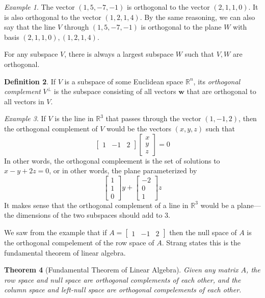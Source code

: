 \documentclass[11pt,oneside]{amsbook}
\newcommand{\R}{\mathbb R}
\theoremstyle{definition}
\theoremstyle{plain}
\newtheorem{theorem}{Theorem}[section]
\theoremstyle{definition}
\newtheorem{definition}[theorem]{Definition}
\theoremstyle{remark}
\newtheorem{example}[theorem]{Example}
\numberwithin{equation}{section}
\numberwithin{figure}{section}
\begin{document}
\begin{example}
  The vector $(1,5,-7,-1)$ is orthogonal to the vector $(2,1,1,0)$. It is also orthogonal to the vector $(1,2,1,4)$. By the same reasoning, we can also say that the line $V$ through $(1,5,-7,-1)$ is orthogonal to the plane $W$ with basis $(2,1,1,0),(1,2,1,4)$.
\end{example}

For any subspace $V$, there is always a largest subspace $W$ such that $V,W$ are orthogonal.

\begin{definition}
  If $V$ is a subspace of some Euclidean space $\R^n$, its \emph{orthogonal complement} $V^\perp$ is the subspace consisting of all vectors $\mathbf{w}$ that are orthogonal to all vectors in $V$.
\end{definition}

\begin{example}
  If $V$ is the line in $\R^3$ that passes through the vector $(1,-1,2)$, then the orthogonal complement of $V$ would be the vectors $(x,y,z)$ such that
  \[\begin{bmatrix}1&-1&2\end{bmatrix}
    \begin{bmatrix}x\\y\\z\end{bmatrix}=0
  \]
  In other words, the orthogonal compleement is the set of solutions to $x-y+2z=0$, or in other words, the plane parameterized by
  \[\begin{bmatrix}1\\1\\0\end{bmatrix}y
    +\begin{bmatrix}-2\\0\\1\end{bmatrix}z
  \]
  It makes sense that the orthogonal complement of a line in $\R^3$ would be a plane---the dimensions of the two subspaces should add to $3$.
\end{example}

We saw from the example that if $A=\begin{bmatrix}1&-1&2\end{bmatrix}$ then the null space of $A$ is the orthogonal compelement of the row space of $A$. Strang states this is the fundamental theorem of linear algebra.

\begin{theorem}[Fundamental Theorem of Linear Algebra]
  Given any matrix $A$, the row space and null space are orthogonal complements of each other, and the column space and left-null space are orthogonal compelements of each other.
\end{theorem}
\end{document}
